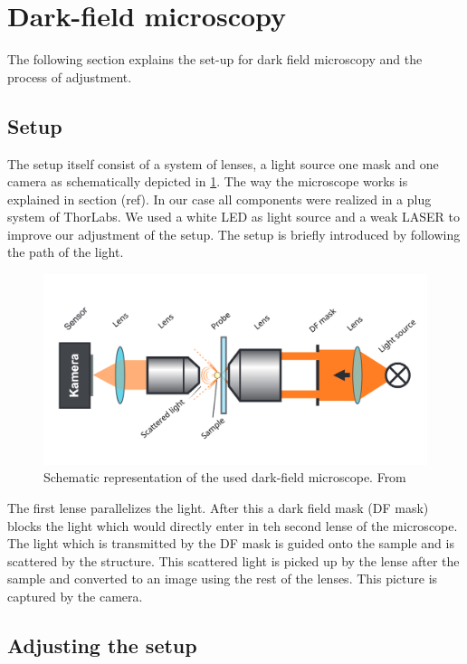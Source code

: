 \section{Dark-field microscopy}
\label{sec:DarkFMicro}

The following section explains the set-up for dark field microscopy and the process of adjustment. 

\subsection{Setup}

The setup itself consist of a system of lenses, a light source one mask and one camera as schematically depicted in \cref{fig:DarkFMicro}.
The way the microscope works is explained in section (ref). In our case all components were realized in a plug system of ThorLabs. We used a white LED as light source and a weak LASER to improve our adjustment of the setup. 
The setup is briefly introduced by following the path of the light. 

\begin{figure}[ht]
    \centering
    \includegraphics[width = \linewidth]{Bilder/Setup/MikroskopEdit.png}
    \caption{Schematic representation of the used dark-field microscope. From \cite{LehrstuhlExperimentalphysikIII.2023}}
    \label{fig:DarkFMicro}
\end{figure}

The first lense parallelizes the light. After this a dark field mask (DF mask) blocks the light which would directly enter in teh second lense of the microscope. The light which is transmitted by the DF mask is guided onto the sample and 
is scattered by the structure. This scattered light is picked up by the lense after the sample and converted to an image using the rest of the lenses. This picture is captured by the camera.

\subsection{Adjusting the setup}

